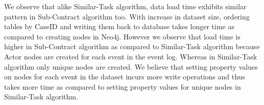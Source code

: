 \documentclass[11pt]{article}
\makeatletter
\newcommand{\specialcell}[2][c]{%
  \begin{tabular}[#1]{@{}c@{}}#2\end{tabular}}
\makeatother
\begin{document}
{{%
\renewcommand{\arraystretch}{.5}
\begin{figure}[H]
\CenterFloatBoxes
{}
\end{figure}
\par{We observe that alike Similar-Task algorithm, data load time exhibits similar pattern in Sub-Contract algorithm too. With increase in dataset size, ordering tables by CaseID and writing them back to database takes longer time as compared to creating nodes in Neo4j. However we observe that load time is higher in Sub-Contract algorithm as compared to Similar-Task algorithm because Actor nodes are created for each event in the event log. Whereas in Similar-Task algorithm only unique nodes are created. We believe that setting property values on nodes for each event in the dataset incurs more write operations and thus takes more time as compared to setting property values for unique nodes in Similar-Task algorithm.}

}}
\end{document}
